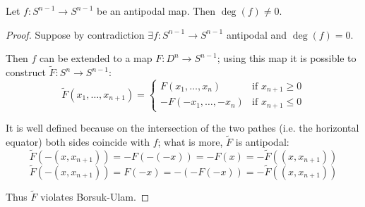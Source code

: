 \documentclass[10pt]{article}
\begin{document}
\begin{theorem}
  Let $f:S^{n-1} \rightarrow S^{n-1}$ be an antipodal map. Then $\deg(f) \neq 0$.
\end{theorem}
\begin{proof}
  Suppose by contradiction $\exists f:S^{n-1} \rightarrow S^{n-1}$ antipodal and $\deg(f)=0$.

  Then $f$ can be extended to a map $F:D^n \rightarrow S^{n-1}$; using this map it is possible to construct $\tilde F: S^n\rightarrow S^{n-1}$:
  \[
    \tilde F(x_1, \dots, x_{n+1})=
    \begin{cases}
      F(x_1, \dots, x_n) & \mbox{if }x_{n+1} \geq 0\\
      -F(-x_1, \dots, -x_n) & \mbox{if }x_{n+1} \leq 0
    \end{cases}
  \]

  It is well defined because on the intersection of the two pathes (i.e. the horizontal equator) both sides coincide with $f$; what is more, $\tilde F$ is antipodal:
  \[
    \tilde F(-(x, x_{n+1})) = -F(-(-x)) = -F(x) = - \tilde F((x, x_{n+1}))
  \]
  \[
    \tilde F(-(x, x_{n+1})) = F(-x) = - (-F(-x)) = - \tilde F((x, x_{n+1}))
  \]

  Thus $\tilde F$ violates Borsuk-Ulam.

\end{proof}
\end{document}
